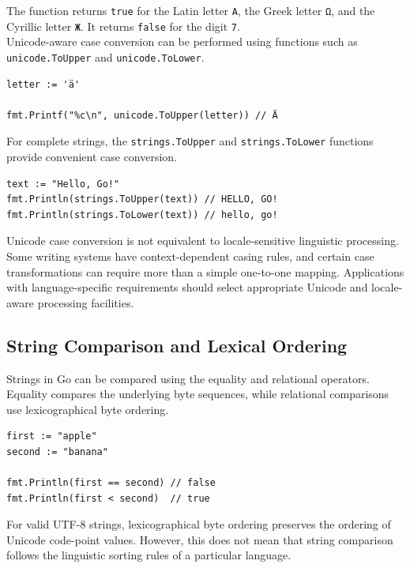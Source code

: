 The function returns \texttt{true} for the Latin letter \texttt{A}, the Greek letter \texttt{Ω}, and the Cyrillic letter \texttt{Ж}. It returns \texttt{false} for the digit \texttt{7}.\\

Unicode-aware case conversion can be performed using functions such as \texttt{unicode.ToUpper} and \texttt{unicode.ToLower}.

\begin{lstlisting}
letter := 'ä'

fmt.Printf("%c\n", unicode.ToUpper(letter)) // Ä
\end{lstlisting}

For complete strings, the \texttt{strings.ToUpper} and \texttt{strings.ToLower} functions provide convenient case conversion.

\begin{lstlisting}
text := "Hello, Go!"
fmt.Println(strings.ToUpper(text)) // HELLO, GO!
fmt.Println(strings.ToLower(text)) // hello, go!
\end{lstlisting}

Unicode case conversion is not equivalent to locale-sensitive linguistic processing. Some writing systems have context-dependent casing rules, and certain case transformations can require more than a simple one-to-one mapping. Applications with language-specific requirements should select appropriate Unicode and locale-aware processing facilities.

\subsection{String Comparison and Lexical Ordering}

Strings in Go can be compared using the equality and relational operators. Equality compares the underlying byte sequences, while relational comparisons use lexicographical byte ordering.

\begin{lstlisting}
first := "apple"
second := "banana"

fmt.Println(first == second) // false
fmt.Println(first < second)  // true
\end{lstlisting}

For valid UTF-8 strings, lexicographical byte ordering preserves the ordering of Unicode code-point values. However, this does not mean that string comparison follows the linguistic sorting rules of a particular language.\\

